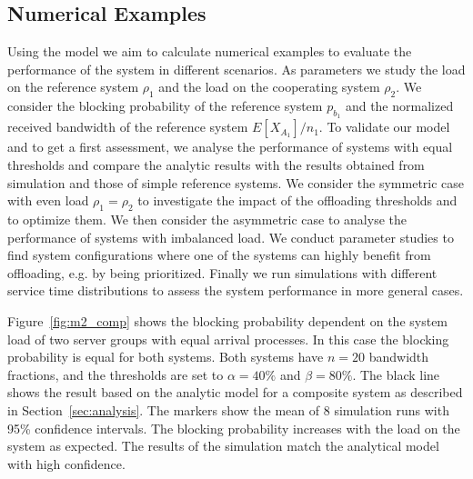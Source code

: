 \subsection{Numerical Examples}\label{sec:aggregation:performance_model:numerical_examples}

Using the model we aim to calculate numerical examples to evaluate the performance of the system in different scenarios.
As parameters we study the load on the reference system $\rho_1$ and the load on the cooperating system $\rho_2$.
We consider the blocking probability of the reference system $p_{b_1}$ and the normalized received bandwidth of the reference system $E[X_{A_1}]/n_1$.
To validate our model and to get a first assessment, we analyse the performance of systems with equal thresholds and compare the analytic results with the results obtained from simulation and those of simple reference systems.
We consider the symmetric case with even load $\rho_1=\rho_2$ to investigate the impact of the offloading thresholds and to optimize them.
We then consider the asymmetric case to analyse the performance of systems with imbalanced load.
We conduct parameter studies to find system configurations where one of the systems can highly benefit from offloading, e.g. by being prioritized.
Finally we run simulations with different service time distributions to assess the system performance in more general cases.


Figure~\ref{fig:m2_comp} shows the blocking probability dependent on the system load of two server groups with equal arrival processes.
In this case the blocking probability is equal for both systems. Both systems have $n=20$ bandwidth fractions, and the thresholds are set to $\alpha=40\%$ and $\beta=80\%$.
The black line shows the result based on the analytic model for a composite system as described in Section~\ref{sec:analysis}.
The markers show the mean of 8 simulation runs with 95\% confidence intervals.
The blocking probability increases with the load on the system as expected.
The results of the simulation match the analytical model with high confidence.

